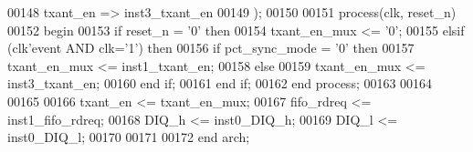 \begin{DoxyCode}
00148       txant_en             => inst3_txant_en
00149         \textcolor{vhdlchar}{)};
00150         
00151 \textcolor{keywordflow}{process}(clk, reset_n)
00152 \textcolor{vhdlkeyword}{begin}
00153    \textcolor{keywordflow}{if} \textcolor{vhdlchar}{reset_n} \textcolor{vhdlchar}{=} \textcolor{vhdlchar}{'}\textcolor{vhdllogic}{}\textcolor{vhdllogic}{0}\textcolor{vhdlchar}{'} \textcolor{keywordflow}{then} 
00154       \textcolor{vhdlchar}{txant_en_mux} \textcolor{vhdlchar}{<=} \textcolor{vhdlchar}{'}\textcolor{vhdllogic}{}\textcolor{vhdllogic}{0}\textcolor{vhdlchar}{'};
00155    \textcolor{keywordflow}{elsif} \textcolor{vhdlchar}{(}\textcolor{vhdlchar}{clk}\textcolor{vhdlchar}{'}\textcolor{vhdlkeyword}{event} \textcolor{keywordflow}{AND} \textcolor{vhdlchar}{clk}\textcolor{vhdlchar}{=}\textcolor{vhdlchar}{'}\textcolor{vhdllogic}{}\textcolor{vhdllogic}{1}\textcolor{vhdlchar}{'}\textcolor{vhdlchar}{)} \textcolor{keywordflow}{then} 
00156       \textcolor{keywordflow}{if}  \textcolor{vhdlchar}{pct_sync_mode} \textcolor{vhdlchar}{=} \textcolor{vhdlchar}{'}\textcolor{vhdllogic}{}\textcolor{vhdllogic}{0}\textcolor{vhdlchar}{'} \textcolor{keywordflow}{then} 
00157          \textcolor{vhdlchar}{txant_en_mux} \textcolor{vhdlchar}{<=} \textcolor{vhdlchar}{inst1_txant_en};
00158       \textcolor{keywordflow}{else} 
00159          \textcolor{vhdlchar}{txant_en_mux} \textcolor{vhdlchar}{<=} \textcolor{vhdlchar}{inst3_txant_en}; 
00160       \textcolor{keywordflow}{end} \textcolor{keywordflow}{if};
00161    \textcolor{keywordflow}{end} \textcolor{keywordflow}{if};
00162 \textcolor{keywordflow}{end} \textcolor{keywordflow}{process};
00163 
00164 
00165 
00166 \textcolor{vhdlchar}{txant_en}    \textcolor{vhdlchar}{<=} \textcolor{vhdlchar}{txant_en_mux};
00167 \textcolor{vhdlchar}{fifo_rdreq}  \textcolor{vhdlchar}{<=} \textcolor{vhdlchar}{inst1_fifo_rdreq};
00168 \textcolor{vhdlchar}{DIQ_h}       \textcolor{vhdlchar}{<=} \textcolor{vhdlchar}{inst0_DIQ_h};
00169 \textcolor{vhdlchar}{DIQ_l}       \textcolor{vhdlchar}{<=} \textcolor{vhdlchar}{inst0_DIQ_l};
00170 
00171   
00172 \textcolor{keywordflow}{end} \textcolor{vhdlchar}{arch};
\end{DoxyCode}
